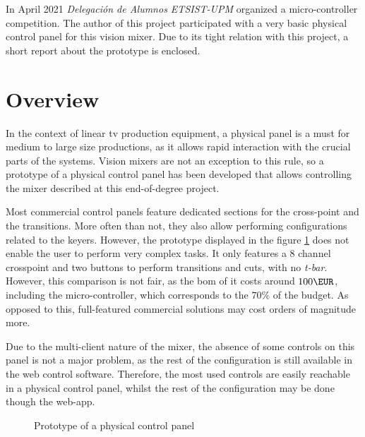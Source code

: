 \documentclass[../main.tex]{subfiles}
\begin{document}
In April 2021 \textit{Delegación de Alumnos ETSIST-UPM} organized a micro-controller competition. The author of this project participated with a very basic physical control panel for this vision mixer. Due to its tight relation with this project, a short report about the prototype is enclosed.\newline

\section{Overview}
In the context of linear \gls{tv} production equipment, a physical panel is a must for medium to large size productions, as it allows rapid interaction with the crucial parts of the systems. Vision mixers are not an exception to this rule, so a prototype of a physical control panel has been developed that allows controlling the mixer described at this end-of-degree project.\newline


Most commercial control panels feature dedicated sections for the cross-point and the transitions. More often than not, they also allow performing configurations related to the keyers. However, the prototype displayed in the figure \ref{fig:control_panel_proto} does not enable the user to perform very complex tasks. It only features a 8 channel crosspoint and two buttons to perform transitions and cuts, with no \textit{t-bar}. However, this comparison is not fair, as the \gls{bom} of it costs around $100 \si{\EUR}$, including the micro-controller, which corresponds to the $70 \si{\%}$ of the budget. As opposed to this, full-featured commercial solutions may cost orders of magnitude more.\newline

Due to the multi-client nature of the mixer, the absence of some controls on this panel is not a major problem, as the rest of the configuration is still available in the web control software. Therefore, the most used controls are easily reachable in a physical control panel, whilst the rest of the configuration may be done though the web-app.\newline

\begin{figure}[hbtp]
    \centering

    \label{fig:control_panel_proto}
    \caption{Prototype of a physical control panel}
\end{figure}
\end{document}
